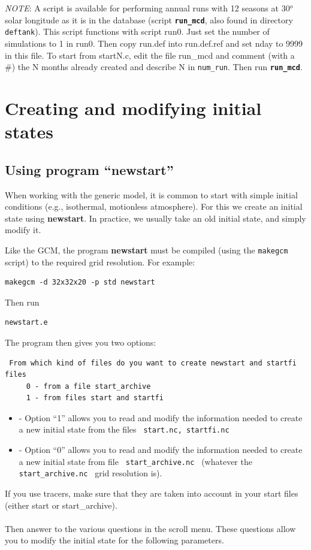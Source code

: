 {\it NOTE}: A script is available for performing annual runs with 12 seasons
at 30$^o$ solar longitude
as it is in the database (script {\bf \tt run\_mcd}, also found in directory
{\tt deftank}).
This script functions with script run0. Just set the number of simulations to
1 in run0. Then copy run.def into run.def.ref and set nday to 9999 in this
file. To start from startN.c, edit the file run\_mcd and comment
(with a \#) the N months already created and describe N in {\tt num\_run}.
Then run  {\bf \tt run\_mcd}.


\section{Creating and modifying initial states}

\label{sc:newstart}

\subsection{Using program ``newstart''}

When working with the generic model, it is common to start with simple initial conditions (e.g., isothermal, motionless atmosphere). For this we create an initial state using {\bf newstart}. In practice, we usually take an old initial state, and simply modify it.

Like the GCM, the program {\bf newstart} must be compiled (using the {\tt makegcm} script) to the required grid resolution.
For example:
\begin{verbatim}
makegcm -d 32x32x20 -p std newstart
\end{verbatim}

Then run

\begin{verbatim}
newstart.e
\end{verbatim}

The program then gives you two options:

\begin{verbatim}
 From which kind of files do you want to create newstart and startfi files
     0 - from a file start_archive
     1 - from files start and startfi
\end{verbatim}

\begin{itemize}
\item{-} Option ``1'' allows you to read and modify the information needed
to create a new initial state  from the files
\verb+ start.nc, startfi.nc +
\item{-} Option ``0'' allows you to read and modify the information needed to
create a new initial state from file
\verb+ start_archive.nc + (whatever the \verb+ start_archive.nc +
grid resolution is).\\
\end{itemize}
If you use tracers, make sure that they are taken into account in your
start files (either start or start\_archive).\\ \\
Then answer to the various questions in the scroll menu.
These questions allow you to modify the initial state for the following
parameters.\\


